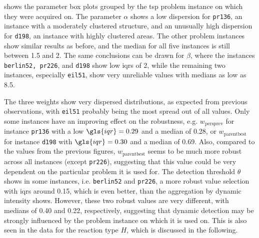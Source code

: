  shows the parameter box plots grouped by the \gls{tsp} problem instance on which they were acquired on. The parameter $\alpha$ shows a low dispersion for \texttt{pr136}, an instance with a moderately clustered structure, and an unusually high dispersion for \texttt{d198}, an instance with highly clustered areas. The other problem instances show similar results as before, and the median for all five instances is still between 1.5 and 2. The same conclusions can be drawn for $\beta$, where the instances \texttt{berlin52, pr226}, and \texttt{d198} show low \glspl{iqr} of 2, while the remaining two instances, especially \texttt{eil51}, show very unreliable values with medians as low as 8.5. 

The three weights show very dispersed distributions, as expected from previous observations, with \texttt{eil51} probably being the most spread out of all values. Only some instances have an improving effect on the robustness, e.g. $w_{\text{persprev}}$ for instance \texttt{pr136} with a low $\gls{iqr} =  0.29$ and a median of 0.28, or $w_{\text{parentbest}}$ for instance \texttt{d198} with $\gls{iqr} =  0.30$ and a median of 0.69. Also, compared to the values from the previous figures, $w_{\text{parentbest}}$ seems to be much more robust across all instances (except \texttt{pr226}), suggesting that this value could be very dependent on the particular problem it is used for.
The detection threshold $\theta$ shows in some instances, i.e. \texttt{berlin52} and \texttt{pr226}, a more robust value selection with \glspl{iqr} around 0.15, which is even better, than the aggregation by dynamic intensity shows. However, these two robust values are very different, with medians of 0.40 and 0.22, respectively, suggesting that dynamic detection may be strongly influenced by the problem instance on which it is used on. This is also seen in the data for the reaction type $H$, which is discussed in the following.
 
